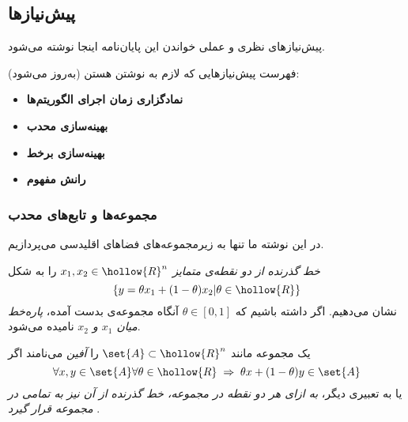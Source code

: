 \documentclass[a4paper,11px]{article}
\newcommand{\basepath}{../}
\begin{document}
\subsection{
پیش‌نیازها
}

پیش‌نیازهای نظری و عملی خواندن این پایان‌نامه اینجا نوشته می‌شود.


فهرست پیش‌نیازهایی که لازم به نوشتن هستن (به‌روز می‌شود):
\begin{itemize}
\item {\bf
نمادگزاری زمان اجرای الگوریتم‌ها
}


\item {\bf
بهینه‌سازی محدب
}

\item {\bf
بهینه‌سازی برخط
}

\item {\bf
رانش مفهوم
}

\end{itemize}












\subsubsection{
مجموعه‌ها و تابع‌های محدب
}
در این نوشته ما تنها به زیرمجموعه‌های فضاهای اقلیدسی می‌پردازیم.

\textit{
خط گذرنده از دو نقطه‌ی متمایز
$x_1, x_2 \in \hollow{R}^n$}
را به شکل
\[
\left\lbrace y = \theta x_1 + (1 - \theta ) x_2 | \theta \in \hollow{R} \right\rbrace
\]
نشان می‌دهیم. اگر داشته باشیم که
$\theta \in [0,1]$
آنگاه مجموعه‌ی بدست آمده،
\textit{
پاره‌خط میان
$x_1$
و
$x_2$}
نامیده می‌شود.


یک مجموعه مانند
$\set{A} \subset \hollow{R}^n$
را
\textit{
آفین
}
می‌نامند اگر
\[
\forall x,y \in \set{A} \forall \theta \in \hollow{R} \; \Rightarrow \; \theta x + (1-\theta) y \in \set{A}
\]
یا به تعبیری دیگر،
\textit{
به ازای هر دو نقطه در مجموعه، خط گذرنده از آن نیز به تمامی در مجموعه قرار گیرد
}.
\end{document}
